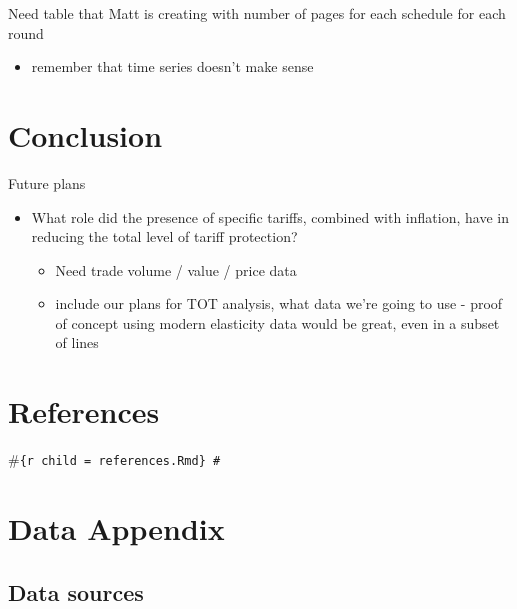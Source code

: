 \documentclass[
  12pt,
]{article}
\providecommand{\tightlist}{%
  \setlength{\itemsep}{0pt}\setlength{\parskip}{0pt}}
\begin{document}
Need table that Matt is creating with number of pages for each schedule for each round

\begin{itemize}
\tightlist
\item
  remember that time series doesn't make sense
\end{itemize}

\hypertarget{conclusion}{%
\section{Conclusion}\label{conclusion}}

Future plans

\begin{itemize}
\item
  What role did the presence of specific tariffs, combined with inflation, have in reducing the total level of tariff protection?

  \begin{itemize}
  \item
    Need trade volume / value / price data
  \item
    include our plans for TOT analysis, what data we're going to use - proof of concept using modern elasticity data would be great, even in a subset of lines
  \end{itemize}
\end{itemize}

\hypertarget{references}{%
\section{References}\label{references}}

\#\texttt{\{r\ child\ =\ \textquotesingle{}references.Rmd\textquotesingle{}\}\ \#}

\hypertarget{dataappendix}{%
\section{Data Appendix}\label{dataappendix}}

\hypertarget{data-sources-1}{%
\subsection{Data sources}\label{data-sources-1}}
\end{document}

